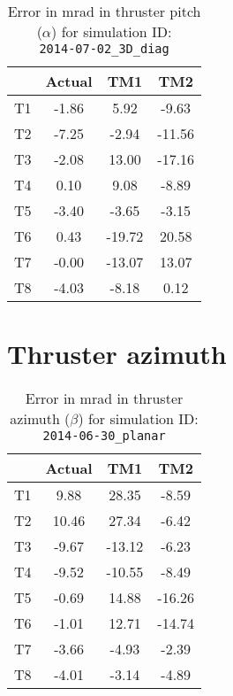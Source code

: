 \begin{table}[H]
\centering
\cprotect\caption{Error in mrad in thruster pitch ($\alpha$) for simulation ID:\\
\verb|2014-07-02_3D_diag|}
\begin{tabular}{|c|c|c|c|} \hline
~ & Actual & TM1 & TM2 \\ \hline
T1 & -1.86 & 5.92 & -9.63 \\
T2 & -7.25 & -2.94 & -11.56 \\
T3 & -2.08 & 13.00 & -17.16 \\
T4 & 0.10 & 9.08 & -8.89 \\
T5 & -3.40 & -3.65 & -3.15 \\
T6 & 0.43 & -19.72 & 20.58 \\
T7 & -0.00 & -13.07 & 13.07 \\
T8 & -4.03 & -8.18 & 0.12 \\ \hline
\end{tabular}
\label{alpha-6}
\end{table}
\newpage
\section*{Thruster azimuth}


\begin{table}[H]
\centering
\cprotect\caption{Error in mrad in thruster azimuth ($\beta$) for simulation ID:\\
\verb|2014-06-30_planar|}
\begin{tabular}{|c|c|c|c|} \hline
~ & Actual & TM1 & TM2 \\ \hline
T1 & 9.88 & 28.35 & -8.59 \\
T2 & 10.46 & 27.34 & -6.42 \\
T3 & -9.67 & -13.12 & -6.23 \\
T4 & -9.52 & -10.55 & -8.49 \\
T5 & -0.69 & 14.88 & -16.26 \\
T6 & -1.01 & 12.71 & -14.74 \\
T7 & -3.66 & -4.93 & -2.39 \\
T8 & -4.01 & -3.14 & -4.89 \\ \hline
\end{tabular}
\label{beta-1}
\end{table}

